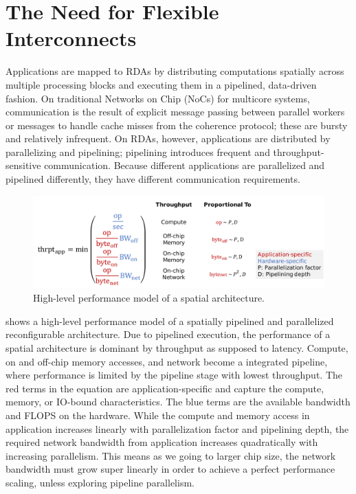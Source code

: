\section{The Need for Flexible Interconnects}
Applications are mapped to RDAs by distributing computations spatially across multiple processing
blocks and executing them in a pipelined, data-driven fashion. 
On traditional Networks on Chip
(NoCs) for multicore systems, communication is the result of explicit message passing between
parallel workers or messages to handle cache misses from the coherence protocol; these are bursty and
relatively infrequent. 
On RDAs, however, applications are distributed by parallelizing and pipelining; 
pipelining introduces frequent and throughput-sensitive communication. 
Because different applications are parallelized and pipelined differently, they have different communication requirements.

\begin{figure}
\centering
\includegraphics[width=1\textwidth]{figs/perfmodel.pdf}
\caption[High-level performance model of a spatial architecture]{
High-level performance model of a spatial architecture. 
}
\label{fig:perfmodel}
\end{figure}

 shows a high-level performance model of a spatially pipelined and parallelized
reconfigurable architecture.
Due to pipelined execution, the performance of a spatial architecture is dominant by throughput as
supposed to latency. 
Compute, on and off-chip memory accesses, and network become a integrated pipeline, 
where performance is limited by the pipeline stage with lowest throughput.
The red terms in the equation are application-specific and capture the compute, memory, or IO-bound characteristics.
The blue terms are the available bandwidth and FLOPS on the hardware.
While the compute and memory access in application increases linearly with parallelization factor and pipelining depth,
the required network bandwidth from application increases quadratically with increasing parallelism.
This means as we going to larger chip size, the network bandwidth must grow super linearly in
order to achieve a perfect performance scaling, unless exploring pipeline parallelism.


